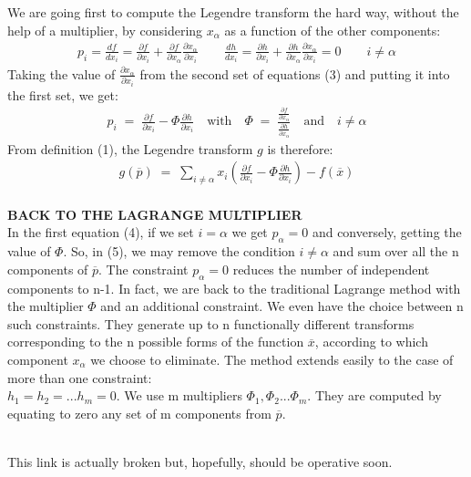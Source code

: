 \documentclass[12pt]{article}
\begin{document}
We are going first to compute the Legendre transform the hard way, without the help of a multiplier, by considering $x_\alpha$ as a function of the other components: 
\begin{align}
p_i=\frac{df}{dx_i}=\frac{\partial f}{\partial x_i}+\frac{\partial f}{\partial x_\alpha}\frac{\partial x_\alpha}{\partial x_i}\quad\quad \frac{dh}{dx_i}=\frac{\partial h}{\partial x_i}+\frac{\partial h}{\partial x_\alpha}\frac{\partial x_\alpha}{\partial x_i}=0\quad\quad i\neq\alpha
\end{align}
Taking the value of \Large $\frac{\partial x_\alpha}{\partial x_i}$ \normalsize from the second set of equations (3) and putting it into the first set, we get:
\begin{align}
p_i\;=\;\frac{\partial f}{\partial x_i}-\Phi\frac{\partial h}{\partial x_i}\quad \mbox{with} \quad \Phi\;=\;\frac{\frac{\partial f}{\partial x_\alpha}}{\frac{\partial h}{\partial x_\alpha}}\quad\mbox{and}\quad i\neq\alpha 
\end{align}
From definition (1), the Legendre transform $g$ is therefore:
\begin{align}
g(\overline{p})\;=\;\sum_{i\neq\alpha} x_i\left( \frac{\partial f}{\partial x_i} - \Phi\frac{\partial h}{\partial x_i}\right)-f(\overline{x})
\end{align}\\
\textbf{BACK TO THE LAGRANGE MULTIPLIER}\\

In the first equation (4), if we set $i=\alpha$ we get $p_\alpha = 0$ and conversely, getting the value of $\Phi$. So, in (5), we may remove the condition $i\neq\alpha$ and sum over all the n components of $\overline{p}$. The constraint $p_\alpha = 0$ reduces the number of independent components to n-1. In fact, we are back to the traditional Lagrange method with the multiplier $\Phi$ and an additional constraint. We even have the choice between n such constraints. They generate up to n functionally different transforms corresponding to the n possible forms of the function $\overline{x}$, according to which component $x_\alpha$ we choose to eliminate. 
The method extends easily to the case of more than one constraint:\\ $h_1=h_2=...h_m=0$. We use m multipliers $\Phi_1, \Phi_2...\Phi_m$. They are computed by equating to zero any set of m components from $\overline{p}$.
\begin{thebibliography}{1}
 \\
This link is actually broken but, hopefully, should be operative soon.
 
\end{thebibliography}

\end{document}
